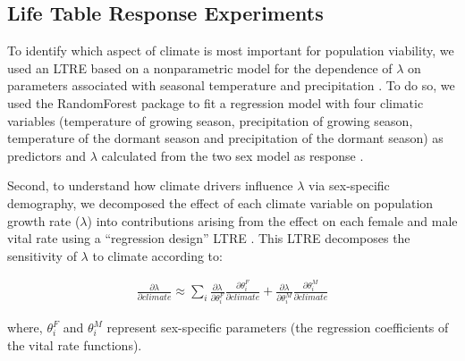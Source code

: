 \documentclass[9pt,twocolumn,twoside,lineno]{pnas-new}
\newcommand{\tom}[2]{{\color{red}{#1}}\footnote{\textit{\color{red}{#2}}}}
\newcommand{\jacob}[2]{{\color{blue}{#1}}\footnote{\textit{\color{blue}{#2}}}}
\begin{document}
\subsection*{Life Table Response Experiments}
To identify which aspect of climate is most important for population viability, we used an LTRE based on a nonparametric model for the dependence of $\lambda$ on parameters associated with seasonal temperature and precipitation \citep{ellner2016data}. 
To do so, we used the RandomForest package to fit a regression model with four climatic variables (temperature of growing season, precipitation of growing season, temperature of the dormant season and precipitation of the dormant season) as predictors  and $\lambda$  calculated from the two sex model as response \citep{liaw2002classification}.

Second, to understand how climate drivers influence $\lambda$ via sex-specific demography, we decomposed the effect of each climate variable on population growth rate ($\lambda$) into contributions arising from the effect on each female and male vital rate using a ``regression design'' LTRE \citep{caswell1989analysis}.
This LTRE decomposes the sensitivity of $\lambda$ to climate according to:

\begin{align}\label{eq:ltresex}
\frac{\partial \lambda}{\partial climate} \approx \sum_{i} \frac{\partial \lambda}{\partial \theta^{F}_{i}} \frac{\partial \theta^{F}_{i}}{\partial climate} + \frac{\partial \lambda}{\partial \theta^{M}_{i}} \frac{\partial \theta^{M}_{i}}{\partial climate}
\end{align}

\noindent where, $\theta^{F}_{i}$ and $\theta^{M}_{i}$ represent sex-specific parameters (the regression coefficients of the vital rate functions). 
\end{document}
